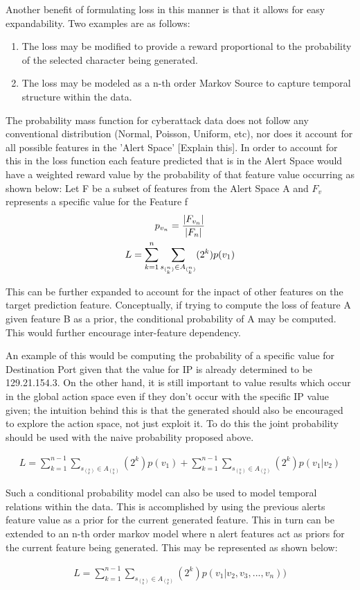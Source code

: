 Another benefit of formulating loss in this manner is that it allows for easy expandability. Two examples are as follows: 
\begin{enumerate}
	\item The loss may be modified to provide a reward proportional to the probability of the selected character being generated. 
	\item The loss may be modeled as a n-th order Markov Source to capture temporal structure within the data. 
\end{enumerate}

The probability mass function for cyberattack data does not follow any conventional distribution (Normal, Poisson, Uniform, etc), nor does it account for all possible features in the 'Alert Space' [Explain this]. In order to account for this in the loss function each feature predicted that is in the Alert Space would have a weighted reward value by the probability of that feature value occurring as shown below: Let F be a subset of features from the Alert Space A and $F_v$ represents a specific value for the Feature f
\begin{gather}
p_{v_n} = {|F_{v_n}| \over |F_n|}\\
L = \sum_{k=1}^{n}\sum_{s_{{(^n_k)}} \in A_{(^n_k)}} (2^k)p(v_1)
\end{gather}


This can be further expanded to account for the inpact of other features on the target prediction feature. Conceptually, if trying to compute the loss of feature A given feature B as a prior, the conditional probability of A may be computed. This would further encourage inter-feature dependency. 

An example of this would be computing the probability of a specific value for Destination Port given that the value for IP is already determined to be 129.21.154.3. On the other hand, it is still important to value results which occur in the global action space even if they don't occur with the specific IP value given; the intuition behind this is that the generated should also be encouraged to explore the action space, not just exploit it. To do this the joint probability should be used with the naive probability proposed above. 

\begin{gather}
L = \sum_{k=1}^{n-1}\sum_{s_{{(^n_k)}} \in A_{(^n_k)}} (2^k)p(v_1) + \sum_{k=1}^{n-1}\sum_{s_{{(^n_k)}} \in A_{(^n_k)}} (2^k)p(v_1|v_2)
\end{gather}

Such a conditional probability model can also be used to model temporal relations within the data. This is accomplished by using the previous alerts feature value as a prior for the current generated feature. This in turn can be extended to an n-th order markov model where n alert features act as priors for the current feature being generated. This may be represented as shown below:

\begin{gather}
L =  \sum_{k=1}^{n-1}\sum_{s_{{(^n_k)}} \in A_{(^n_k)}} (2^k)p(v_1|v_2, v_3, ..., v_n))
\end{gather}

